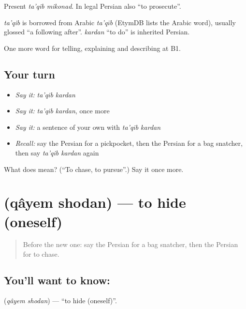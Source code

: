 Present \emph{ta'qib mikonad}. In legal Persian also \textquotedblleft{}to prosecute\textquotedblright{}.

\begin{cousinweb}
\emph{ta'qib} is borrowed from Arabic \emph{ta'qīb} (EtymDB lists the Arabic word), usually glossed \textquotedblleft{}a following after\textquotedblright{}. \emph{kardan} \textquotedblleft{}to do\textquotedblright{} is inherited Persian.
\end{cousinweb}

\begin{grammarlens}[title={What you've built}]
One more word for telling, explaining and describing at B1.
\end{grammarlens}

\subsection*{Your turn}
\begin{itemize}
\raggedright
  \item \emph{Say it:} \emph{ta'qib kardan}
  \item \emph{Say it:} \emph{ta'qib kardan}, once more
  \item \emph{Say it:} a sentence of your own with \emph{ta'qib kardan}
  \item \emph{Recall:} say the Persian for a pickpocket, then the Persian for a bag snatcher, then say \emph{ta'qib kardan} again
\end{itemize}

\begin{tcolorbox}[breakable,colback=teal!4,colframe=teal!35!black,title={Before you move on}]
What does   mean? (\textquotedblleft{}To chase, to pursue\textquotedblright{}.) Say it once more.
\end{tcolorbox}
\section[\texorpdfstring{\fa{قایم} \fa{شدن} (qâyem shodan)}{قایم شدن (qâyem shodan)}]{  (qâyem shodan) — to hide (oneself)}

\label{lesson:FA-C317-qayem-shodan}



\begin{quote}
Before the new one: say the Persian for a bag snatcher, then the Persian for to chase.
\end{quote}

\subsection*{You'll want to know:  }
\textbf{ } (\emph{qâyem shodan}) — \textquotedblleft{}to hide (oneself)\textquotedblright{}.

